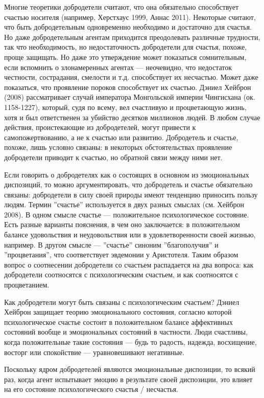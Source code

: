\documentclass[11pt]{book}
\begin{document}
Многие теоретики добродетели считают, что она обязательно способствует счастью носителя (например, Херстхаус 1999, Аннас 2011). Некоторые считают, что быть добродетельным одновременно необходимо и достаточно для счастья. Но даже добродетельным агентам приходится преодолевать различные трудности, так что необходимость, но недостаточность добродетели для счастья, похоже, проще защищать. Но даже это утверждение может показаться сомнительным, если вспомнить о злонамеренных агентах --- неочевидно, что недостаток честности, сострадания, смелости и т.д. способствует их несчастью. Может даже показаться, что проявление пороков способствует их счастью. Дэниел Хейброн (2008) рассматривает случай императора Монгольской империи Чингисхана (ок. 1158-1227), который, судя по всему, вел счастливую и процветающую жизнь, хотя и был ответственен за убийство десятков миллионов людей. В любом случае действия, проистекающие из добродетелей, могут привести к самопожертвованию, а не к счастью или развитию. Добродетель и счастье, похоже, лишь условно связаны: в некоторых обстоятельствах проявление добродетели приводит к счастью, но обратной связи между ними нет.

Если говорить о добродетелях как о состоящих в основном из эмоциональных диспозиций, то можно аргументировать, что добродетель и счастье обязательно связаны: добродетели в силу своей природы имеют тенденцию приносить пользу людям. Термин ''счастье'' используется в двух разных смыслах (см. Хейброн 2008). В одном смысле счастье --- положительное психологическое состояние. Есть разные варианты пояснения, в чем оно заключается: в положительном балансе удовольствия и неудовольствия или в удовлетворенности своей жизнью, например. В другом смысле --- ''счастье'' синоним ''благополучия'' и ''процветания'', что соответствует эвдемонии у Аристотеля. Таким образом вопрос о соотнесении добродетели со счастьем распадается на два вопроса: как добродетели соотносятся с психологическим счастьем, и как соотносятся с процветанием.

Как добродетели могут быть связаны с психологическим счастьем? Дэниел Хейброн защищает теорию эмоционального состояния, согласно которой психологическое счастье состоит в положительном балансе аффективных состояний вообще и эмоциональных состояний в частности. Люди счастливы, когда положительные такие состояния --- будь то радость, надежда, восхищение, восторг или спокойствие --- уравновешивают негативные.

Поскольку ядром добродетелей являются эмоциональные диспозиции, то всякий раз, когда агент испытывает эмоцию в результате своей диспозиции, это влияет на его состояние психологического счастья / несчастья.
\end{document}
